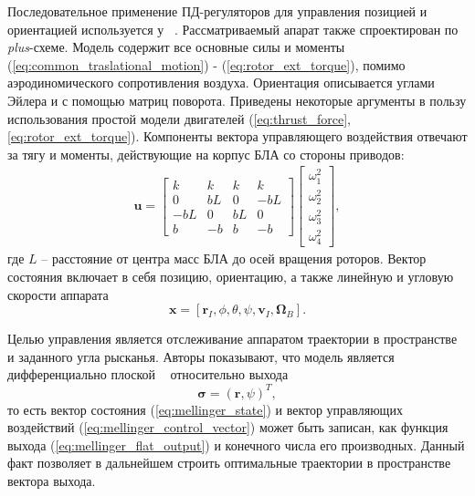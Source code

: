 Последовательное применение ПД-регуляторов для управления позицией и ориентацией используется  у ~\cite{Mellinger01}. Рассматриваемый апарат также спроектирован по \textit{plus}-схеме. Модель содержит все основные силы и моменты
(\ref{eq:common_traslational_motion}) - (\ref{eq:rotor_ext_torque}),
помимо аэродиномического сопротивления воздуха.
Ориентация описывается углами Эйлера и с помощью матриц поворота.
Приведены некоторые аргументы в пользу использования простой модели двигателей
(\ref{eq:thrust_force}, \ref{eq:rotor_ext_torque}).
Компоненты вектора управляющего воздействия отвечают за тягу и моменты, действующие на корпус БЛА со стороны приводов:
\begin{equation} \label{eq:mellinger_control_vector}
	\begin{aligned}
	\bm{u} =
	\begin{bmatrix}
	k & k & k & k\\
	0 & bL & 0 & -bL\\
	-bL & 0 & bL & 0\\
	b & -b & b & -b
	\end{bmatrix}
	\begin{bmatrix}
	\omega^{2}_{1}\\
	\omega^{2}_{2}\\
	\omega^{2}_{3}\\
	\omega^{2}_{4}
	\end{bmatrix},
	\end{aligned}
\end{equation}
где $L$ -- расстояние от центра масс БЛА до осей вращения роторов.
Вектор состояния включает в себя позицию, ориентацию, а также линейную и угловую скорости аппарата
\begin{equation} \label{eq:mellinger_state}
\bm{x} = [\bm{r}_I, \phi, \theta, \psi, \bm{v}_I, \bm{\Omega}_B].
\end{equation}

Целью управления является отслеживание аппаратом траектории в пространстве и заданного угла рысканья. Авторы показывают, что модель является дифференциально плоской ~\cite{Belinskaya01, Nieuwstadt01} относительно выхода
\begin{equation} \label{eq:mellinger_flat_output}
\bm{\sigma} = (\bm{r},\psi)^T,
\end{equation}
то есть вектор состояния (\ref{eq:mellinger_state}) и вектор управляющих воздействий (\ref{eq:mellinger_control_vector}) может быть записан, как функция выхода  (\ref{eq:mellinger_flat_output}) и конечного числа его производных. Данный факт позволяет в дальнейшем строить оптимальные траектории в пространстве вектора выхода.

